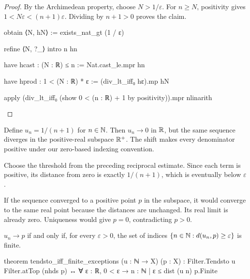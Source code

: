\begin{proof}
  By the Archimedean property, choose $N>1/\varepsilon$.
  For $n\geq N$, positivity gives $1<N\varepsilon<(n+1)\varepsilon$.
  Dividing by $n+1>0$ proves the claim.

  \begin{lean}
    obtain ⟨N, hN⟩ := exists_nat_gt (1 / ε)

    refine ⟨N, ?_⟩
    intro n hn

    have hcast : (N : ℝ) ≤ n := Nat.cast_le.mpr hn

    have hprod : 1 < (N : ℝ) * ε := (div_lt_iff₀ hε).mp hN

    apply (div_lt_iff₀ (show 0 < (n : ℝ) + 1 by positivity)).mpr
    nlinarith
  \end{lean}

\end{proof}

\begin{example}
  Define $u_n=1/(n+1)$ for $n\in\mathbb{N}$.
  Then $u_n\to0$ in $\mathbb{R}$, but the same sequence diverges in the positive-real subspace $\mathbb{R}^{+}$.
  The shift makes every denominator positive under our zero-based indexing convention.

  Choose the threshold from the preceding reciprocal estimate.
  Since each term is positive, its distance from zero is exactly $1/(n+1)$, which is eventually
  below $\varepsilon$.

  If the sequence converged to a positive point $p$ in the subspace, it would converge to the same
  real point because the distances are unchanged.
  Its real limit is already zero.
  Uniqueness would give $p=0$, contradicting $p>0$.
\end{example}

\begin{lemma}
  \label{an1:lem:convergesTo-iff-finite-exceptions}
  $u_n\to p$ if and only if, for every $\varepsilon>0$, the set of indices $\{n\in\mathbb{N}:d(u_n,p)\geq\varepsilon\}$ is finite.

  \begin{lean}
    theorem tendsto_iff_finite_exceptions (u : ℕ → X) (p : X) :
        Filter.Tendsto u Filter.atTop (nhds p) ↔ ∀ ε : ℝ, 0 < ε → {n : ℕ | ε ≤ dist (u n) p}.Finite
  \end{lean}
\end{lemma}

